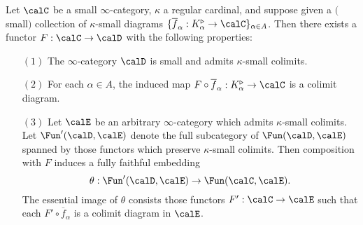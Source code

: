 \begin{lemma}\label{sleepyswine}
Let $\calC$ be a small $\infty$-category, $\kappa$ a regular cardinal, and suppose given
a $($small$)$ collection of $\kappa$-small diagrams $\{ \overline{f}_{\alpha}: K_{\alpha}^{\triangleright} \rightarrow \calC \}_{\alpha \in A}$. Then there exists a functor $F: \calC \rightarrow \calD$ with the following properties:
\begin{itemize}
\item[$(1)$] The $\infty$-category $\calD$ is small and admits $\kappa$-small colimits.
\item[$(2)$] For each $\alpha \in A$, the induced map $F \circ \overline{f}_{\alpha}: K_{\alpha}^{\triangleright} \rightarrow \calC$ is a colimit diagram.
\item[$(3)$] Let $\calE$ be an arbitrary $\infty$-category which admits $\kappa$-small colimits. Let
$\Fun'(\calD, \calE)$ denote the full subcategory of $\Fun(\calD, \calE)$ spanned by those functors which preserve $\kappa$-small colimits. Then composition with $F$ induces a fully faithful embedding
$$ \theta: \Fun'(\calD, \calE) \rightarrow \Fun( \calC, \calE).$$
The essential image of $\theta$ consists those functors $F': \calC \rightarrow \calE$ such that
each $F' \circ \overline{f}_{\alpha}$ is a colimit diagram in $\calE$.
\end{itemize}
\end{lemma}

